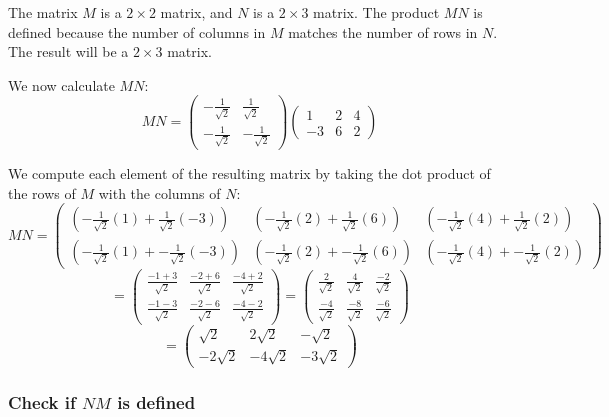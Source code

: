 \documentclass[11pt]{article}
\begin{document}
The matrix \( M \) is a \( 2 \times 2 \) matrix, and \( N \) is a \( 2 \times 3 \) matrix. The product \( MN \) is defined because the number of columns in \( M \) matches the number of rows in \( N \). The result will be a \( 2 \times 3 \) matrix.

We now calculate \( MN \):
\[
MN = \begin{pmatrix} -\frac{1}{\sqrt{2}} & \frac{1}{\sqrt{2}} \\ -\frac{1}{\sqrt{2}} & -\frac{1}{\sqrt{2}} \end{pmatrix} \begin{pmatrix} 1 & 2 & 4 \\ -3 & 6 & 2 \end{pmatrix}
\]

We compute each element of the resulting matrix by taking the dot product of the rows of \( M \) with the columns of \( N \):
\[
MN = \begin{pmatrix}
\left( -\frac{1}{\sqrt{2}}(1) + \frac{1}{\sqrt{2}}(-3) \right) & \left( -\frac{1}{\sqrt{2}}(2) + \frac{1}{\sqrt{2}}(6) \right) & \left( -\frac{1}{\sqrt{2}}(4) + \frac{1}{\sqrt{2}}(2) \right) \\
\left( -\frac{1}{\sqrt{2}}(1) + -\frac{1}{\sqrt{2}}(-3) \right) & \left( -\frac{1}{\sqrt{2}}(2) + -\frac{1}{\sqrt{2}}(6) \right) & \left( -\frac{1}{\sqrt{2}}(4) + -\frac{1}{\sqrt{2}}(2) \right)
\end{pmatrix}
\]
\[
= \begin{pmatrix}
\frac{-1 + 3}{\sqrt{2}} & \frac{-2 + 6}{\sqrt{2}} & \frac{-4 + 2}{\sqrt{2}} \\
\frac{-1 - 3}{\sqrt{2}} & \frac{-2 - 6}{\sqrt{2}} & \frac{-4 - 2}{\sqrt{2}}
\end{pmatrix}
= \begin{pmatrix}
\frac{2}{\sqrt{2}} & \frac{4}{\sqrt{2}} & \frac{-2}{\sqrt{2}} \\
\frac{-4}{\sqrt{2}} & \frac{-8}{\sqrt{2}} & \frac{-6}{\sqrt{2}}
\end{pmatrix}
\]
\[
= \begin{pmatrix}
\sqrt{2} & 2\sqrt{2} & -\sqrt{2} \\
-2\sqrt{2} & -4\sqrt{2} & -3\sqrt{2}
\end{pmatrix}
\]

\newpage

\subsubsection*{Check if \( NM \) is defined}
\end{document}
